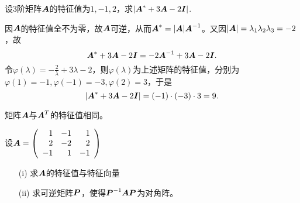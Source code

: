 \begin{frame}[fragile]

\begin{li}
  设$3$阶矩阵$\boldsymbol{A}$的特征值为$1,-1,2$，求$|\boldsymbol{A}^*+3\boldsymbol{A}-2\boldsymbol{I}|$.
\end{li} \pause 
\begin{jie}
  因$\boldsymbol{A}$的特征值全不为零，故$\boldsymbol{A}$可逆，从而$\boldsymbol{A}^*=|\boldsymbol{A}|\boldsymbol{A}^{-1}$。又因$|\boldsymbol{A}|=\lambda_1\lambda_2\lambda_3=-2$，故
  $$
  \boldsymbol{A}^*+3\boldsymbol{A}-2\boldsymbol{I}=-2\boldsymbol{A}^{-1}+3\boldsymbol{A}-2\boldsymbol{I}.
  $$
  令$\varphi(\lambda)=-\frac2\lambda+3\lambda-2$，则$\varphi(\lambda)$为上述矩阵的特征值，分别为$\varphi(1)=-1,\varphi(-1)=-3,\varphi(2)=3$，于是
  $$
  |\boldsymbol{A}^*+3\boldsymbol{A}-2\boldsymbol{I}|=(-1)\cdot(-3)\cdot3=9.
  $$
\end{jie}
\end{frame}

\begin{frame}[fragile]

\begin{xingzhi}
  矩阵$\boldsymbol{A}$与$\boldsymbol{A}^T$的特征值相同。
\end{xingzhi}


\end{frame}

\begin{frame}[fragile]


\begin{li}
  设$\boldsymbol{A}=\left(
    \begin{array}{rrr}
      1&-1&1\\
      2&-2&2\\
      -1&1&-1
    \end{array}
  \right)$
  \begin{itemize}
  \item[(i)]求$\boldsymbol{A}$的特征值与特征向量
  \item[(ii)] 求可逆矩阵$\boldsymbol{P}$，使得$\boldsymbol{P}^{-1}\boldsymbol{A}\boldsymbol{P}$为对角阵。 
  \end{itemize}
\end{li}
\end{frame}

